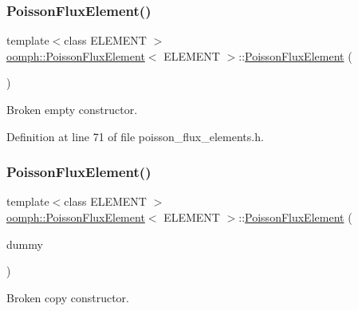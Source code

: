 \subsubsection{\texorpdfstring{Poisson\+Flux\+Element()}{PoissonFluxElement()}\hspace{0.1cm}{\footnotesize\ttfamily [2/3]}}
{\footnotesize\ttfamily template$<$class E\+L\+E\+M\+E\+NT $>$ \\
\hyperlink{classoomph_1_1PoissonFluxElement}{oomph\+::\+Poisson\+Flux\+Element}$<$ E\+L\+E\+M\+E\+NT $>$\+::\hyperlink{classoomph_1_1PoissonFluxElement}{Poisson\+Flux\+Element} (\begin{DoxyParamCaption}{ }\end{DoxyParamCaption})\hspace{0.3cm}{\ttfamily [inline]}}



Broken empty constructor. 



Definition at line 71 of file poisson\+\_\+flux\+\_\+elements.\+h.

\mbox{\label{classoomph_1_1PoissonFluxElement_a82c6268bcf26d0a44ff55650a5e57bc3}} 
\subsubsection{\texorpdfstring{Poisson\+Flux\+Element()}{PoissonFluxElement()}\hspace{0.1cm}{\footnotesize\ttfamily [3/3]}}
{\footnotesize\ttfamily template$<$class E\+L\+E\+M\+E\+NT $>$ \\
\hyperlink{classoomph_1_1PoissonFluxElement}{oomph\+::\+Poisson\+Flux\+Element}$<$ E\+L\+E\+M\+E\+NT $>$\+::\hyperlink{classoomph_1_1PoissonFluxElement}{Poisson\+Flux\+Element} (\begin{DoxyParamCaption}\item[{const \hyperlink{classoomph_1_1PoissonFluxElement}{Poisson\+Flux\+Element}$<$ E\+L\+E\+M\+E\+NT $>$ \&}]{dummy }\end{DoxyParamCaption})\hspace{0.3cm}{\ttfamily [inline]}}



Broken copy constructor. 



